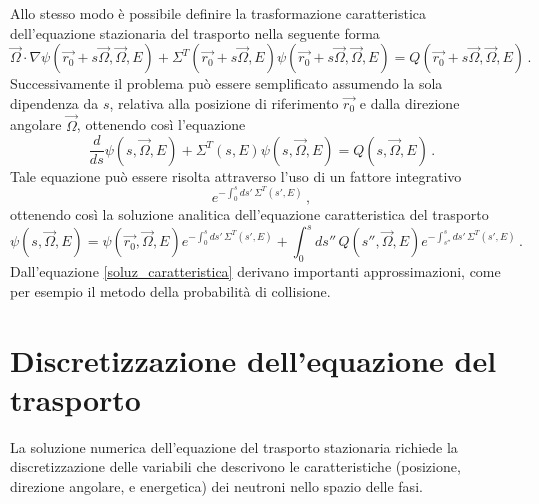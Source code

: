 Allo stesso modo è possibile definire la trasformazione caratteristica 
dell'equazione stazionaria del trasporto nella seguente forma
\begin{equation}
\vec{\Omega}\cdot\nabla \psi 
(\vec{r_0}+s\vec{\Omega},\vec{\Omega},E)+\Sigma^T(\vec{r_0}+s\vec{\Omega},E) 
\psi(\vec{r_0}+s\vec{\Omega},\vec{\Omega},E) = 
Q(\vec{r_0}+s\vec{\Omega},\vec{\Omega},E) \,.
\end{equation}
Successivamente il problema pu\`o essere semplificato assumendo la sola dipendenza da $s$, 
relativa alla posizione di riferimento $\vec{r_0}$ e dalla direzione angolare 
$\vec{\Omega}$, ottenendo così l'equazione 
\begin{equation}
\label{eqcarat}
\frac{d}{ds}\psi(s,\vec{\Omega},E)+\Sigma^T(s,E)\psi(s,\vec{\Omega},E)=Q(s,\vec{
\Omega},E) \,.
\end{equation}
Tale equazione può essere risolta attraverso l'uso di un fattore integrativo
\begin{equation}
e^{-\int^s_0 ds' \, \Sigma^T(s',E)} \,,
\end{equation}
ottenendo così la soluzione analitica dell'equazione caratteristica del 
trasporto
\begin{equation}
\label{soluz_caratteristica}
\psi(s,\vec{\Omega},E)=\psi(\vec{r_0},\vec{\Omega},E) e^{-\int^s_0 ds' \, 
\Sigma^T(s',E)} +\int_0^s ds'' \, Q(s'',\vec{\Omega},E) e^{-\int^s_{s''} ds' \, 
\Sigma^T(s',E)} \,.
\end{equation}
Dall'equazione \eqref{soluz_caratteristica} derivano importanti approssimazioni, 
come per esempio il metodo della probabilità di collisione.



\section{Discretizzazione dell'equazione del trasporto}
La soluzione numerica dell'equazione del trasporto stazionaria richiede la 
discretizzazione delle variabili che descrivono le caratteristiche (posizione, 
direzione angolare, e energetica) dei neutroni nello spazio delle fasi. 

